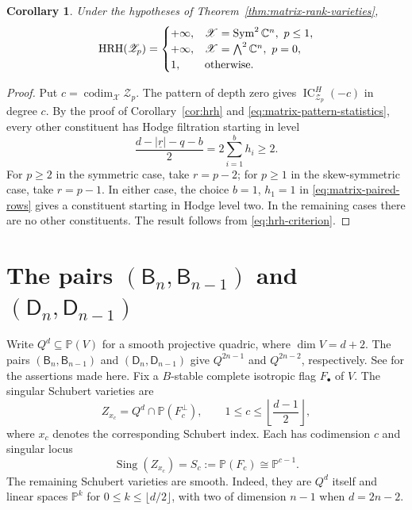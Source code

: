 \documentclass[12pt]{amsart}
\newtheorem{cor}[theorem]{Corollary}
\theoremstyle{definition}
\numberwithin{equation}{section}
\begin{document}
\begin{cor}\label{cor:matrix-hrh}
Under the hypotheses of
Theorem~\ref{thm:matrix-rank-varieties},
\[
\operatorname{HRH}(\mathscr Z_p)=
\begin{cases}
+\infty,
   &\mathscr X=\operatorname{Sym}^2\mathbb C^n,\ p\leq1,\\
+\infty,
   &\mathscr X=\bigwedge^2\mathbb C^n,\ p=0,\\
1,&\textnormal{otherwise}.
\end{cases}
\]
\end{cor}
\begin{proof}
Put $c=\operatorname{codim}_{\mathscr X}\mathscr Z_p$.
The pattern of depth zero gives
$\operatorname{IC}_{\mathscr Z_p}^H(-c)$ in degree $c$.
By the proof of Corollary~\ref{cor:hrh} and
\eqref{eq:matrix-pattern-statistics}, every other constituent
has Hodge filtration starting in level
\[
\frac{d-|\underline r|-q-b}{2}
=2\sum_{i=1}^b h_i\geq2.
\]
For $p\geq2$ in the symmetric case, take $r=p-2$;
for $p\geq1$ in the skew-symmetric case, take $r=p-1$.
In either case, the choice $b=1$, $h_1=1$ in
\eqref{eq:matrix-paired-rows} gives a constituent starting
in Hodge level two. In the remaining cases there are no
other constituents. The result follows from
\eqref{eq:hrh-criterion}.
\end{proof}

\section{The pairs $(\mathsf{B}_n,\mathsf{B}_{n-1})$ and $(\mathsf{D}_n,\mathsf{D}_{n-1})$}\label{sec:quadrics}

Write $Q^d\subseteq\mathbb P(V)$ for a smooth projective
quadric, where $\dim V=d+2$.
The pairs $(\mathsf B_n,\mathsf B_{n-1})$ and
$(\mathsf D_n,\mathsf D_{n-1})$ give $Q^{2n-1}$ and
$Q^{2n-2}$, respectively. See \cite[Section 9.2.28]{billey} for the assertions made here.
Fix a $B$-stable complete isotropic flag $F_\bullet$ of $V$. The singular Schubert varieties are
\begin{equation}\label{eq:quadric-exceptions}
Z_{x_c}=Q^d\cap\mathbb P(F_c^\perp),
\qquad
1\leq c\leq\left\lfloor\frac{d-1}{2}\right\rfloor,
\end{equation}
where $x_c$ denotes the corresponding Schubert index.
Each has codimension $c$ and singular locus
\[
\operatorname{Sing}(Z_{x_c})
=S_c:=\mathbb P(F_c)\cong\mathbb P^{c-1}.
\]
The remaining Schubert varieties are smooth. Indeed, they are $Q^d$
itself and linear spaces $\mathbb P^k$ for
$0\leq k\leq\lfloor d/2\rfloor$, with two of dimension
$n-1$ when $d=2n-2$.
\end{document}
